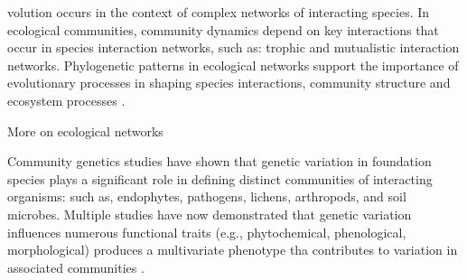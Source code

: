 \documentclass[9pt,twocolumn,twoside,lineno]{pnas-new}
\begin{document}


\maketitle
\thispagestyle{firststyle}




volution occurs in the context of complex networks of
interacting species. In ecological communities, community dynamics
depend on key interactions \cite{Fontaine2011} that occur in species
interaction networks, such as:  trophic \cite{Bascompte2006} and
mutualistic \cite{Rafferty2013} interaction networks. Phylogenetic
patterns in ecological networks support the importance of evolutionary
processes in shaping species interactions, community structure and
ecosystem processes \cite{Crutsinger2016, Rezende2007, Whitham2006a}. 

More on ecological networks 

Community genetics studies \cite{Lamit2015} have shown that
genetic variation in foundation species \cite{Ellison2005} plays a
significant role in defining distinct communities of interacting
organisms:  such as, endophytes, pathogens, lichens, arthropods, and
soil microbes. Multiple studies have now demonstrated that genetic
variation influences numerous functional traits (e.g., phytochemical,
phenological, morphological) produces a multivariate phenotype
\cite{holeski2012} tha contributes to variation in associated
communities \cite{Bailey2009a}.
\end{document}

